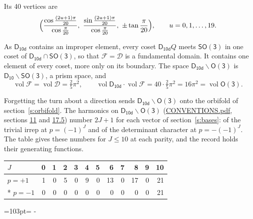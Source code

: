 \documentclass[10pt,a4paper]{article}
\newcommand{\needspace}[1]{\par\penalty-100\begingroup\dimen0=#1\relax\dimen2=\pagegoal
  \advance\dimen2-\pagetotal\ifdim\dimen0>\dimen2\relax\ifdim\dimen2>0pt\vfil\break\fi\fi
  \endgroup}
\numberwithin{equation}{section}
\newcommand{\grp}[1]{\mathsf{#1}}
\newcommand{\vol}{\operatorname{vol}}
\newcommand{\fcell}{\mathcal{D}}
\newcommand{\fdomain}{\mathcal{F}}
\begin{document}
\leavevmode\label{n:local.vertex.u}Its 40 vertices are
\begin{equation}\label{e:prism}\Bigl(\frac{\cos\frac{(2u+1)\pi}{20}}{\cos\frac{\pi}{20}},\ \frac{\sin\frac{(2u+1)\pi}{20}}{\cos\frac{\pi}{20}},\ \pm\tan\frac{\pi}{20}\Bigr),\qquad u = 0, 1, \dots, 19.\end{equation}

\leavevmode\label{n:set.fundamental}As $\grp{D_{10d}}$ contains an improper element, every coset $\grp{D_{10d}}Q$ meets \href{SO3.pdf}{$\grp{SO(3)}$} in one coset of $\grp{D_{10d}} \cap \grp{SO(3)}$, so that $\fdomain = \fcell$ is a fundamental domain. It contains one element of every coset, more only on its boundary.
The space $\grp{D_{10d}}\backslash\grp{O(3)}$ is $\grp{D_{10}}\backslash\grp{SO(3)}$, a prism space, and
\begin{equation}\label{e:volume}\vol\fdomain = \vol\fcell = \tfrac{2}{5}\pi^2,\qquad \vol\grp{D_{10d}}\cdot\vol\fdomain = 40\cdot \tfrac{2}{5}\pi^2 = 16\pi^2 = \vol\grp{O(3)}.\end{equation}

Forgetting the turn about a direction sends $\grp{D_{10d}}\backslash\grp{O(3)}$ onto the orbifold of section~\ref{s:orbifold}.
The harmonics on $\grp{D_{10d}}\backslash\grp{O(3)}$ (\href{../../CONVENTIONS.pdf}{CONVENTIONS.pdf}, sections \href{../../CONVENTIONS.pdf\#conv.11}{11} and \href{../../CONVENTIONS.pdf\#conv.17.5}{17.5}) number $2J + 1$ for each vector of section~\ref{s:bases}: of the trivial irrep at $p = (-1)^J$ and of the determinant character at $p = -(-1)^J$. The table gives these numbers for $J \le 10$ at each parity, and the record holds their generating functions.
{\small\setlength{\tabcolsep}{4pt}\begin{longtable}{@{}lrrrrrrrrrrr@{}}\toprule
$J$ & 0 & 1 & 2 & 3 & 4 & 5 & 6 & 7 & 8 & 9 & 10\\\midrule\endhead
\bottomrule\endfoot\endlastfoot
$p = +1$ & 1 & 0 & 5 & 0 & 9 & 0 & 13 & 0 & 17 & 0 & 21\\*
$p = -1$ & 0 & 0 & 0 & 0 & 0 & 0 & 0 & 0 & 0 & 0 & 21\\
\bottomrule\end{longtable}}
\needspace{103pt}
\end{document}

